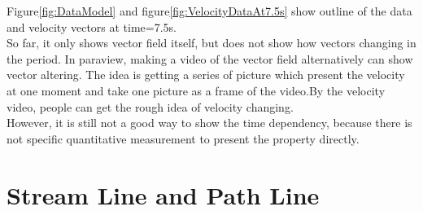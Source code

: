 \documentclass[
     11pt,         %
     a4paper,      %
     oneside,
     ]{article}
\begin{document}
	Figure\ref{fig:DataModel} and figure\ref{fig:VelocityDataAt7.5s} show outline of the data and velocity vectors at time=7.5s.\\
	So far, it only shows vector field itself, but does not show how vectors changing in the period. In paraview, making a video of the vector field alternatively can show vector altering. The idea is getting a series of picture which present the velocity at one moment and take one picture as a frame of the video.By the velocity video, people can get the rough idea of velocity changing.\\
	However, it is still not a good way to show the time dependency, because there is not specific quantitative measurement to present the property directly. 
	
	\section{Stream Line and Path Line}
\end{document}

